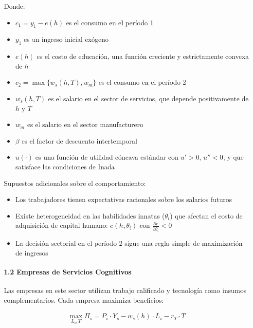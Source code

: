\documentclass{article}
\theoremstyle{remark}
\theoremstyle{definition}
\begin{document}
\begin{tcolorbox}
Donde:
\begin{itemize}
\item $c_1 = y_1 - e(h)$ es el consumo en el período 1
\item $y_1$ es un ingreso inicial exógeno
\item $e(h)$ es el costo de educación, una función creciente y estrictamente convexa de $h$
\item $c_2 = \max\{w_s(h,T), w_m\}$ es el consumo en el período 2
\item $w_s(h,T)$ es el salario en el sector de servicios, que depende positivamente de $h$ y $T$
\item $w_m$ es el salario en el sector manufacturero
\item $\beta$ es el factor de descuento intertemporal
\item $u(\cdot)$ es una función de utilidad cóncava estándar con $u' > 0$, $u'' < 0$, y que satisface las condiciones de Inada
\end{itemize}

Supuestos adicionales sobre el comportamiento:
\begin{itemize}
\item Los trabajadores tienen expectativas racionales sobre los salarios futuros
\item Existe heterogeneidad en las habilidades innatas ($\theta_i$) que afectan el costo de adquisición de capital humano: $e(h,\theta_i)$ con $\frac{\partial e}{\partial \theta_i} < 0$
\item La decisión sectorial en el período 2 sigue una regla simple de maximización de ingresos
\end{itemize}

\paragraph{1.2 Empresas de Servicios Cognitivos}
Las empresas en este sector utilizan trabajo calificado y tecnología como insumos complementarios. Cada empresa maximiza beneficios:

\begin{align}
\max_{L_s,T} \Pi_s = P_s \cdot Y_s - w_s(h) \cdot L_s - r_T \cdot T
\end{align}


\end{tcolorbox}
\end{document}
